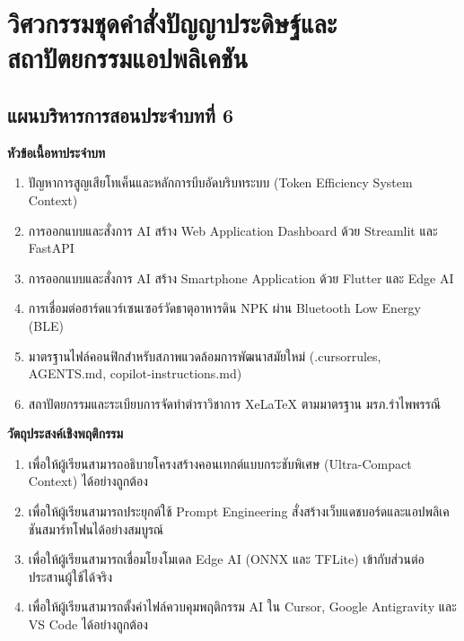 
\chapter{วิศวกรรมชุดคำสั่งปัญญาประดิษฐ์และสถาปัตยกรรมแอปพลิเคชัน}
\label{chap:ch06}

\section*{แผนบริหารการสอนประจำบทที่ 6}

\noindent\textbf{หัวข้อเนื้อหาประจำบท}
\begin{enumerate}
    \item ปัญหาการสูญเสียโทเค็นและหลักการบีบอัดบริบทระบบ (Token Efficiency System Context)
    \item การออกแบบและสั่งการ AI สร้าง Web Application Dashboard ด้วย Streamlit และ FastAPI
    \item การออกแบบและสั่งการ AI สร้าง Smartphone Application ด้วย Flutter และ Edge AI
    \item การเชื่อมต่อฮาร์ดแวร์เซนเซอร์วัดธาตุอาหารดิน NPK ผ่าน Bluetooth Low Energy (BLE)
    \item มาตรฐานไฟล์คอนฟิกสำหรับสภาพแวดล้อมการพัฒนาสมัยใหม่ (.cursorrules, AGENTS.md, copilot-instructions.md)
    \item สถาปัตยกรรมและระเบียบการจัดทำตำราวิชาการ XeLaTeX ตามมาตรฐาน มรภ.รำไพพรรณี
\end{enumerate}

\noindent\textbf{วัตถุประสงค์เชิงพฤติกรรม}
\begin{enumerate}
    \item เพื่อให้ผู้เรียนสามารถอธิบายโครงสร้างคอนเทกต์แบบกระชับพิเศษ (Ultra-Compact Context) ได้อย่างถูกต้อง
    \item เพื่อให้ผู้เรียนสามารถประยุกต์ใช้ Prompt Engineering สั่งสร้างเว็บแดชบอร์ดและแอปพลิเคชันสมาร์ทโฟนได้อย่างสมบูรณ์
    \item เพื่อให้ผู้เรียนสามารถเชื่อมโยงโมเดล Edge AI (ONNX และ TFLite) เข้ากับส่วนต่อประสานผู้ใช้ได้จริง
    \item เพื่อให้ผู้เรียนสามารถตั้งค่าไฟล์ควบคุมพฤติกรรม AI ใน Cursor, Google Antigravity และ VS Code ได้อย่างถูกต้อง
\end{enumerate}

